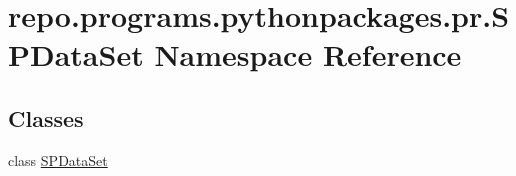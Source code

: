 \hypertarget{namespacerepo_1_1programs_1_1pythonpackages_1_1pr_1_1SPDataSet}{\section{repo.\-programs.\-pythonpackages.\-pr.\-S\-P\-Data\-Set Namespace Reference}
\label{namespacerepo_1_1programs_1_1pythonpackages_1_1pr_1_1SPDataSet}
}
\subsection*{Classes}
\begin{DoxyCompactItemize}
\item 
class \hyperlink{classrepo_1_1programs_1_1pythonpackages_1_1pr_1_1SPDataSet_1_1SPDataSet}{S\-P\-Data\-Set}
\end{DoxyCompactItemize}
